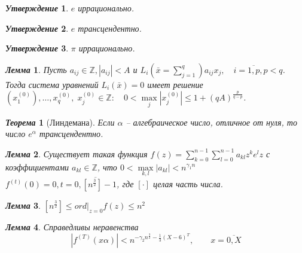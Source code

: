 \documentclass[a4paper,12pt]{article}
\newtheorem{teo2}{\textit{Теорема}}
\newtheorem{utv2}{\textit{Утверждение}}
\newtheorem{lem2}{\textit{Лемма}}
\newcommand{\AL}{\alpha}
\newcommand{\q}{\quad}
\newcommand{\bb}[1]{\mathbb{#1}}
\newcommand{\SL}{\sum\limits}
\begin{document}
\begin{formbox}{}
\begin{utv2} $e$ иррационально.
\end{utv2}
\end{formbox}
\begin{formbox}{}
\begin{utv2} $e$ трансцендентно.
\end{utv2}
\end{formbox}
\begin{formbox}{}
\begin{utv2} $\pi$ иррационально.
\end{utv2}
\end{formbox}
\begin{formbox}{}
\begin{lem2} Пусть \(a_{ij}\in\bb{Z}, |a_{ij}| < A\) и \(L_i(\bar{x} = \SL_{j=1}^q)a_{ij}x_j,\q i=\overline{1,p}, p < q\).\\
Тогда система уравнений \(L_i(\bar{x}) = 0\) имеет решение \((x_1^{(0)}),\dots,x_q^{(0)},\; x_j^{(0)} \in\bb{Z}:\q 0 < \max\limits_{j} |x_j^{(0)}|\le 1 + (qA)^{\frac{p}{q-p}} \).
\end{lem2}
\end{formbox}
\begin{formbox}{}
\begin{teo2} [Линдемана] Если $\AL$ -- алгебраическое число, отличное от нуля, то число $e^\AL$ трансцендентно.
\end{teo2}
\end{formbox}
\newpage
\begin{formbox}{}
\begin{lem2} 
Существует такая функция $f(z) = \SL_{k=0}^{n-1}\SL_{l=0}^{n-1}a_{kl}z^ke^lz $ с коэффициентами $a_{kl} \in \bb{Z}$, что $0 < \max\limits_{k,l} |a_{kl}| < n^{\gamma_1n}$\\
$f^{(t)}(0) = 0, t = \overline{0, [n^{\frac{3}{2}}]-1}$, где $[\cdot]$ целая часть числа.
\end{lem2}
\end{formbox}
\begin{formbox}{}
\begin{lem2}
$[n^{\frac{3}{2}}]\le ord|_{z=0} f(z) \le n^2 $
\end{lem2}
\end{formbox}
\begin{formbox}{}
\begin{lem2} Справедливы неравенства
\[|f^{(T)}(x\AL)|  < n^{-\gamma_2 n^{\frac{3}{2}} - \frac{1}{3} (X-6)^T},\q\q x = \overline{0,X}\]
\end{lem2}
\end{formbox}
\end{document}
